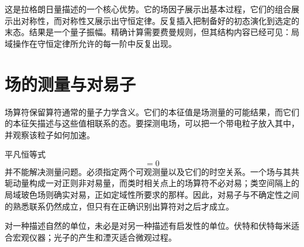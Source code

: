 这是拉格朗日量描述的一个核心优势。它的场因子展示出基本过程，它们的组合展示出对称性，而对称性又展示出守恒定律。反复插入把制备好的初态演化到选定的末态。结果是一个量子振幅。精确计算需要费曼规则，但其结构内容已经可见：局域操作在守恒定律所允许的每一阶中反复出现。

\section{场的测量与对易子}

场算符保留算符通常的量子力学含义。它们的本征值是场测量的可能结果，而它们的本征矢描述与这些值相联系的态。要探测电场，可以把一个带电粒子放入其中，并观察该粒子如何加速。

\begin{classroomqa}
\end{classroomqa}

平凡恒等式
\begin{equation}
[\phi(x),\phi(x)]=0
\end{equation}
并不能解决测量问题。必须指定两个可观测量以及它们的时空关系。一个场与其共轭动量构成一对正则非对易量，而类时相关点上的场算符不必对易；类空间隔上的局域玻色场则确实对易，正如定域性所要求的那样。因此，对易子与不确定性之间的熟悉联系仍然成立，但只有在正确识别出算符对之后才成立。

\begin{classroomqa}
\end{classroomqa}

对一种描述自然的单位，未必是对另一种描述有启发性的单位。伏特和伏特每米适合宏观仪器；光子的产生和湮灭适合微观过程。

\begin{classroomqa}
\end{classroomqa}

